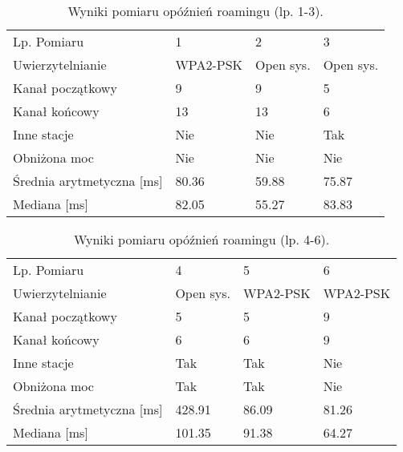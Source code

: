 \begin{center}
\begin{table}
\caption{Wyniki pomiaru opóźnień roamingu (lp. 1-3).}
\begin{tabular}{ | l || l | l | l | }
\hline                       
Lp. Pomiaru & 1 & 2 & 3 \\ 
Uwierzytelnianie & WPA2-PSK & Open sys. & Open sys. \\
Kanał początkowy & 9 & 9 & 5 \\
Kanał końcowy & 13 & 13 & 6 \\
Inne stacje & Nie & Nie & Tak \\
Obniżona moc & Nie & Nie & Nie \\ \hline \hline
Średnia arytmetyczna [ms] & 80.36 & 59.88 & 75.87 \\ \hline \hline
Mediana [ms] & 82.05 & 55.27 & 83.83 \\
\hline  
\end{tabular}
\end{table}
\end{center}

\begin{center}
\begin{table}
\caption{Wyniki pomiaru opóźnień roamingu (lp. 4-6).}
\begin{tabular}{ | l || l | l | l | }
\hline                       
Lp. Pomiaru & 4 & 5 & 6 \\ 
Uwierzytelnianie & Open sys. & WPA2-PSK & WPA2-PSK \\
Kanał początkowy & 5 & 5 & 9 \\
Kanał końcowy & 6 & 6 & 9 \\
Inne stacje & Tak & Tak & Nie \\
Obniżona moc & Tak & Tak & Nie \\ \hline \hline
Średnia arytmetyczna [ms] & 428.91 & 86.09 & 81.26 \\ \hline \hline
Mediana [ms] & 101.35 & 91.38 & 64.27 \\
\hline  
\end{tabular}
\end{table}
\end{center}









